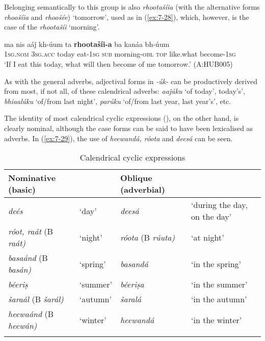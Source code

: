 Belonging semantically to this group is also \textit{rhootašíia} (with the alternative forms \textit{rhoošíia} and \textit{rhoošée}) `tomorrow', used as in (\ref{ex:7-28}), which, however, is the  case of the  \textit{rhootašíi} `morning'.

\begin{exe}
\ex
\label{ex:7-28}
\gll ma nis aáǰ kh-úum ta \textbf{rhootašíi-a} ba kanáa bh-úum\\
\textsc{1sg.nom} \textsc{3sg.acc} today eat-\textsc{1sg} \textsc{sub} morning-\textsc{obl} \textsc{top} like.what become-\textsc{1sg}\\
\glt `If I eat this today, what will then become of me tomorrow.' (A:HUB005)
\end{exe}

As with the general  adverbs, adjectival forms in \textit{-úk-} can be productively derived from most, if not all, of these calendrical adverbs: \textit{aaǰúku} `of today', today's', \textit{bhiaalúku} `of/from last night', \textit{parúku} `of/from last year, last year's', etc. 


The identity of most calendrical cyclic expressions (), on the other hand, is clearly nominal, although the  case forms can be said to have been lexicalised as adverbs. In (\ref{ex:7-29}), the use of \textit{heewandá, róota} and \textit{deesá} can be seen.


\begin{table}[t]
\caption{Calendrical cyclic expressions}
\begin{tabularx}{\textwidth}{ Q l l Q }
\lsptoprule
Nominative (basic) &
&
Oblique (adverbial) &
\\\midrule
\textit{deés} &
`day' &
\textit{deesá} &
`during the day, on the day'\\
\textit{róot, raát} (B \textit{raát)} &
`night' &
\textit{róota} (B \textit{rúuta)} &
`at night'\\
\textit{basaánd} (B \textit{basán)} &
`spring' &
\textit{basandá} &
`in the spring'\\
\textit{béeriṣ} &
`summer' &
\textit{béeriṣa} &
`in the summer'\\
\textit{šaraál} (B \textit{šarál)} &
`autumn' &
\textit{šaralá} &
`in the autumn'\\
\textit{heewaánd} (B \textit{heewán)} &
`winter' &
\textit{heewandá} &
`in the winter'\\\lspbottomrule
\end{tabularx}
\label{tab:7-2}
\end{table}

